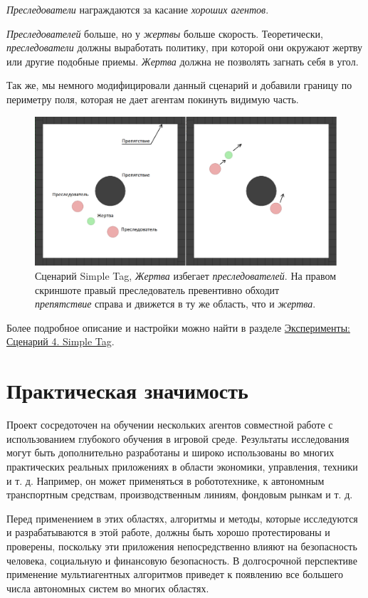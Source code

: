 \textit{Преследователи} награждаются за касание \textit{хороших агентов}.

\textit{Преследователей} больше, но у \textit{жертвы} больше скорость. Теоретически, \textit{преследователи} должны выработать политику, при которой они окружают жертву или другие подобные приемы. \textit{Жертва} должна не позволять загнать себя в угол.

Так же, мы немного модифицировали данный сценарий и добавили границу по периметру поля, которая не дает агентам покинуть видимую часть.

\begin{figure}[ht!] 
	\center
	\includegraphics [scale=0.41] {my_folder/images/st.png}
	\caption{Сценарий Simple Tag, \textit{Жертва} избегает \textit{преследователей}. На правом скриншоте правый преследователь превентивно обходит \textit{препятствие} справа и движется в ту же область, что и \textit{жертва}.}
	\label{fig:st}  
\end{figure}

Более подробное описание и настройки можно найти в разделе \hyperref[exp-st]{Эксперименты: Сценарий 4. Simple Tag}.

\section{Практическая значимость} \label{intro:sec3}

Проект сосредоточен на обучении нескольких агентов совместной работе с использованием глубокого обучения в игровой среде. Результаты исследования могут быть дополнительно разработаны и широко использованы во многих практических реальных приложениях в области экономики, управления, техники и т. д. Например, он может применяться в робототехнике, к автономным транспортным средствам, производственным линиям, фондовым рынкам и т. д.

Перед применением в этих областях, алгоритмы и методы, которые исследуются и разрабатываются в этой работе, должны быть хорошо протестированы и проверены, поскольку эти приложения непосредственно влияют на безопасность человека, социальную и финансовую безопасность. В долгосрочной перспективе применение мультиагентных алгоритмов приведет к появлению все большего числа автономных систем во многих областях. 


